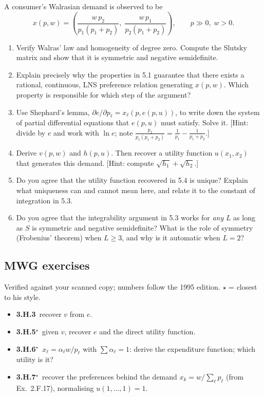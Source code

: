 \documentclass[11pt]{article}
\begin{document}
A consumer's Walrasian demand is observed to be
\[
x(p,w)=\left(\frac{w\,p_2}{p_1(p_1+p_2)},\;\frac{w\,p_1}{p_2(p_1+p_2)}\right),\qquad p\gg0,\;w>0.
\]
\begin{enumerate}[label=\textbf{5.\arabic*}]
  \item Verify Walras' law and homogeneity of degree zero. Compute the Slutsky matrix and show that it is symmetric and negative semidefinite.
  \item Explain precisely why the properties in 5.1 guarantee that there exists a rational, continuous, LNS preference relation generating $x(p,w)$. Which property is responsible for which step of the argument?
  \item Use Shephard's lemma, $\partial e/\partial p_\ell = x_\ell(p,e(p,u))$, to write down the system of partial differential equations that $e(p,u)$ must satisfy. Solve it. [Hint: divide by $e$ and work with $\ln e$; note $\frac{p_2}{p_1(p_1+p_2)}=\frac{1}{p_1}-\frac{1}{p_1+p_2}$.]
  \item Derive $v(p,w)$ and $h(p,u)$. Then recover a utility function $u(x_1,x_2)$ that generates this demand. [Hint: compute $\sqrt{h_1}+\sqrt{h_2}$.]
  \item Do you agree that the utility function recovered in 5.4 is unique? Explain what uniqueness can and cannot mean here, and relate it to the constant of integration in 5.3.
  \item Do you agree that the integrability argument in 5.3 works for \emph{any} $L$ as long as $S$ is symmetric and negative semidefinite? What is the role of symmetry (Frobenius' theorem) when $L\ge3$, and why is it automatic when $L=2$?
\end{enumerate}


\subsection{MWG exercises}
\begin{todo}{Verified against your scanned copy; numbers follow the 1995 edition. $\star$ = closest to his style.}
\begin{itemize}
\item \textbf{3.H.3}\ recover $v$ from $e$.
\item \textbf{3.H.5}$^\star$\ given $v$, recover $e$ and the direct utility function.
\item \textbf{3.H.6}$^\star$\ $x_\ell=\alpha_\ell w/p_\ell$ with $\sum\alpha_\ell=1$: derive the expenditure function; which utility is it?
\item \textbf{3.H.7}$^\star$\ recover the preferences behind the demand $x_k=w/\sum_\ell p_\ell$ (from Ex.~2.F.17), normalising $u(1,\dots,1)=1$.
\end{itemize}
\end{todo}
\end{document}
